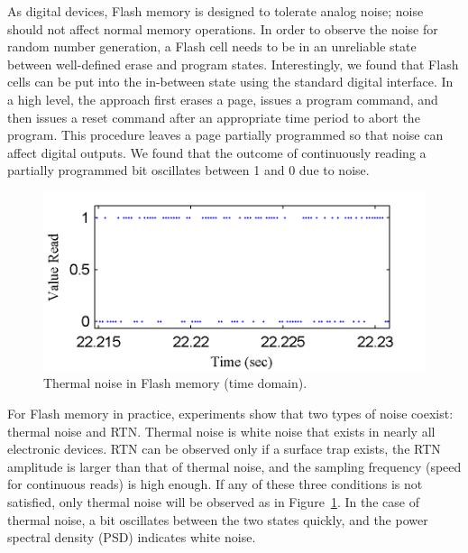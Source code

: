 As digital devices, Flash memory is designed to tolerate analog noise; noise should not affect normal memory operations. In order to observe the noise for random number generation, a Flash cell needs to be in an unreliable state between well-defined erase and program states. Interestingly, we found that Flash cells can be put into the in-between state using the standard digital interface. In a high level, the approach first erases a page, issues a program command, and then issues a reset command after an appropriate time period to abort the program. This procedure leaves a page partially programmed so that noise can affect digital outputs. We found that the outcome of continuously reading a partially programmed bit oscillates between 1 and 0 due to noise. 

\begin{figure} 
\begin{center} 
\includegraphics[width=\mywidth]{figs/thermal_noise.png} 
\caption{Thermal noise in Flash memory (time domain).}
\label{fig:thermal} 
\vspace{-0.25in}
\end{center} 
\end{figure} 

For Flash memory in practice, experiments show that two types of noise coexist: thermal noise and RTN. Thermal noise is white noise that exists in nearly all electronic devices. RTN can be observed only if a surface trap exists, the RTN amplitude is larger than that of thermal noise, and the sampling frequency (speed for continuous reads) is high enough. If any of these three conditions is not satisfied, only thermal noise will be observed as in Figure~\ref{fig:thermal}. In the case of thermal noise, a bit oscillates between the two states quickly, and the power spectral density (PSD) indicates white noise. 


